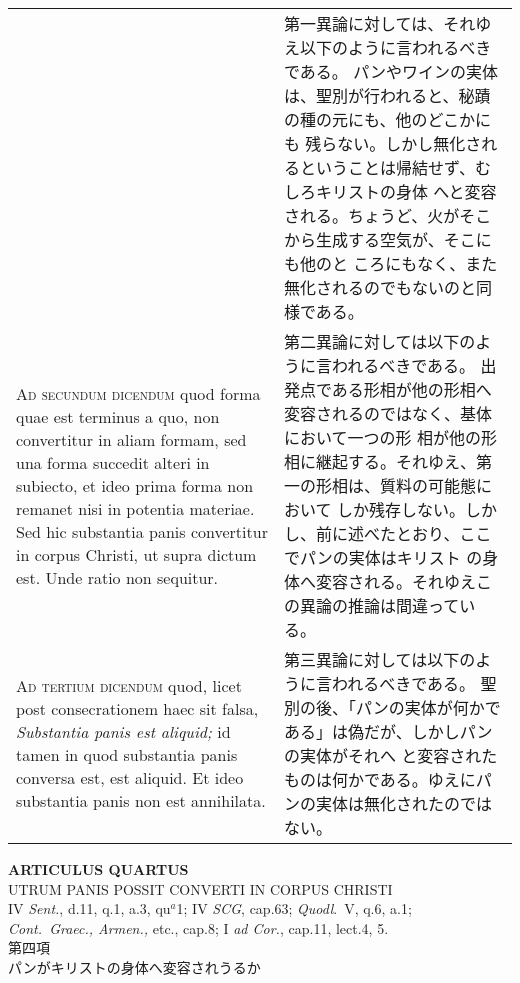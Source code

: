\documentclass[10pt]{jsarticle} %
\begin{document}
\begin{longtable}{p{21em}p{21em}}
&

第一異論に対しては、それゆえ以下のように言われるべきである。
パンやワインの実体は、聖別が行われると、秘蹟の種の元にも、他のどこかにも
 残らない。しかし無化されるということは帰結せず、むしろキリストの身体
 へと変容される。ちょうど、火がそこから生成する空気が、そこにも他のと
 ころにもなく、また無化されるのでもないのと同様である。


\\



{\scshape Ad secundum dicendum} quod forma quae est terminus a quo, non
convertitur in aliam formam, sed una forma succedit alteri in
subiecto, et ideo prima forma non remanet nisi in potentia
materiae. Sed hic substantia panis convertitur in corpus Christi, ut
supra dictum est. Unde ratio non sequitur.

&

第二異論に対しては以下のように言われるべきである。
出発点である形相が他の形相へ変容されるのではなく、基体において一つの形
 相が他の形相に継起する。それゆえ、第一の形相は、質料の可能態において
 しか残存しない。しかし、前に述べたとおり、ここでパンの実体はキリスト
 の身体へ変容される。それゆえこの異論の推論は間違っている。


\\



{\scshape Ad tertium dicendum} quod, licet post consecrationem haec sit falsa,
{\itshape Substantia panis est aliquid;} id tamen in quod substantia panis
conversa est, est aliquid. Et ideo substantia panis non est
annihilata.

&

第三異論に対しては以下のように言われるべきである。
聖別の後、「パンの実体が何かである」は偽だが、しかしパンの実体がそれへ
 と変容されたものは何かである。ゆえにパンの実体は無化されたのではない。


\end{longtable}
\newpage


\begin{center}
{\Large {\bf ARTICULUS QUARTUS}}\\
{\large UTRUM PANIS POSSIT CONVERTI IN CORPUS CHRISTI}\\
{\footnotesize IV {\itshape Sent.}, d.11, q.1, a.3, qu$^a$1; IV
 {\itshape SCG}, cap.63; {\itshape Quodl}.~V, q.6, a.1;\\ {\itshape
 Cont.~Graec., Armen.,} etc., cap.8; I {\itshape ad Cor.}, cap.11,
 lect.4, 5.}\\
{\Large 第四項\\パンがキリストの身体へ変容されうるか}
\end{center}
\end{document}

